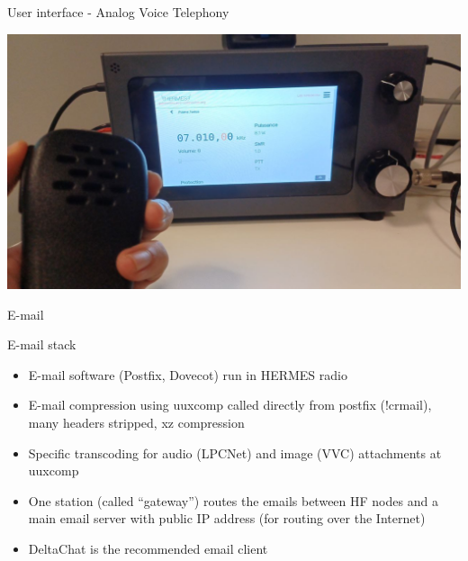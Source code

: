 \documentclass[aspectratio=169,xcolor={x11names,svgnames,dvipsnames}]{beamer}
\begin{document}
\begin{frame}{User interface - Analog Voice Telephony}

  \vspace{-0.15cm}
  \begin{center}
    \includegraphics[width=.9\columnwidth]{hermes5.jpeg}
  \end{center}

\end{frame}


\begin{frame}{E-mail}

\begin{block}{E-mail stack}
  \begin{itemize}
  \item E-mail software (Postfix, Dovecot) run in HERMES radio
  \item E-mail compression using uuxcomp called directly from postfix (!crmail), many headers stripped, xz compression
  \item Specific transcoding for audio (LPCNet) and image (VVC) attachments at uuxcomp
  \item One station (called ``gateway'') routes the emails between HF nodes and a main email server with public IP address (for routing over the Internet)
  \item DeltaChat is the recommended email client
  \end{itemize}
\end{block}

\vspace{-0.15cm}
\begin{center}

\end{center}



\end{frame}
\end{document}
